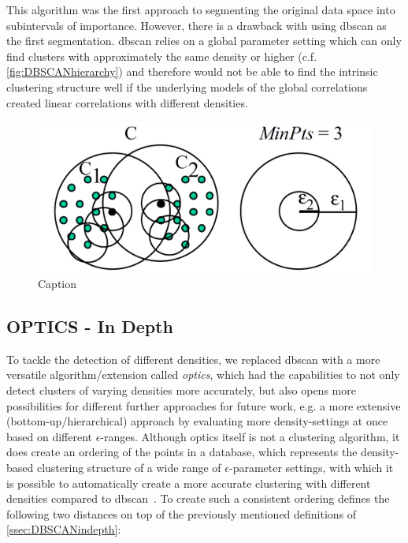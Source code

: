This algorithm was the first approach to segmenting the original data space into subintervals of importance. However, there is a drawback with using \gls{dbscan} as the first segmentation. \gls{dbscan} relies on a global parameter setting which can only find clusters with approximately the same density or higher (c.f. \autoref{fig:DBSCANhierarchy}) and therefore would not be able to find the intrinsic clustering structure well if the underlying models of the global correlations created linear correlations with different densities. 

\begin{figure}
    \centering
    \includegraphics[width=.5\textwidth]{figures/DBSCANleastdensity.png}
    \caption{Caption ~\cite{opticsankerst1999optics}}
    \label{fig:DBSCANhierarchy}
\end{figure}

\subsection{OPTICS - In Depth}\label{ssec:OPTICSindepth} %
To tackle the detection of different densities, we replaced \gls{dbscan} with a more versatile algorithm/extension called \textit{\acrfull{optics}}, which had the capabilities to not only detect clusters of varying densities more accurately, but also opens more possibilities for different further approaches for future work, e.g. a more extensive (bottom-up/hierarchical) approach by evaluating more density-settings at once based on different $\epsilon$-ranges.
Although \gls{optics} itself is not a clustering algorithm, it does create an ordering of the points in a database, which represents the density-based clustering structure of a wide range of $\epsilon$-parameter settings, with which it is possible to automatically create a more accurate clustering with different densities compared to \gls{dbscan}~\cite{opticsankerst1999optics}. To create such a consistent ordering  \citeauthor{opticsankerst1999optics} defines the following two distances on top of the previously mentioned definitions of \autoref{ssec:DBSCANindepth}:
\vspace{5mm}

